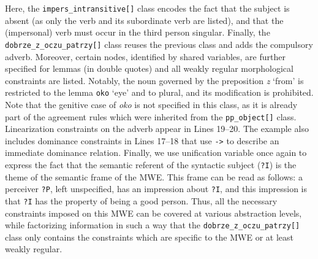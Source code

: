 \documentclass[output=paper
,modfonts
,nonflat
,biblatexbackend=biber
]{langsci/langscibook}
\begin{document}
Here, the \texttt{impers\_intransitive[]} class encodes the fact that the subject is absent (as only the verb  and its subordinate verb are listed), and that the (impersonal) verb must occur in the third person singular. Finally, the \texttt{dobrze\_z\_oczu\_patrzy[]} class reuses the previous class and adds the compulsory adverb. Moreover, certain  nodes, identified by shared variables, are further specified for lemmas (in double quotes) and all weakly regular morphological constraints are listed. Notably, the noun governed by the preposition \textit{z} `from' is restricted to the lemma \texttt{oko} `eye' and to plural, and its modification is prohibited. Note that the genitive case of \textit{oko} is not specified in this class, as it is already part of the agreement rules which were inherited from the \texttt{pp\_object[]} class. Linearization constraints on the adverb appear in Lines 19--20. The example also includes dominance constraints in Lines 17--18 that use \texttt{->} to describe an immediate dominance relation. Finally, we use unification variable once again to express the fact that the semantic referent of the syntactic subject (\texttt{?I}) is the theme of the semantic frame of the MWE. This frame can be read as follows: a perceiver \texttt{?P}, left unspecified, has an impression about \texttt{?I}, and this impression is that \texttt{?I} has the property of being a good person. Thus, all the necessary constraints imposed on this MWE can be covered at various abstraction levels, while factorizing information in such a way that the \texttt{dobrze\_z\_oczu\_patrzy[]} class only contains the constraints which are specific to the MWE or at least weakly regular.
\end{document}
